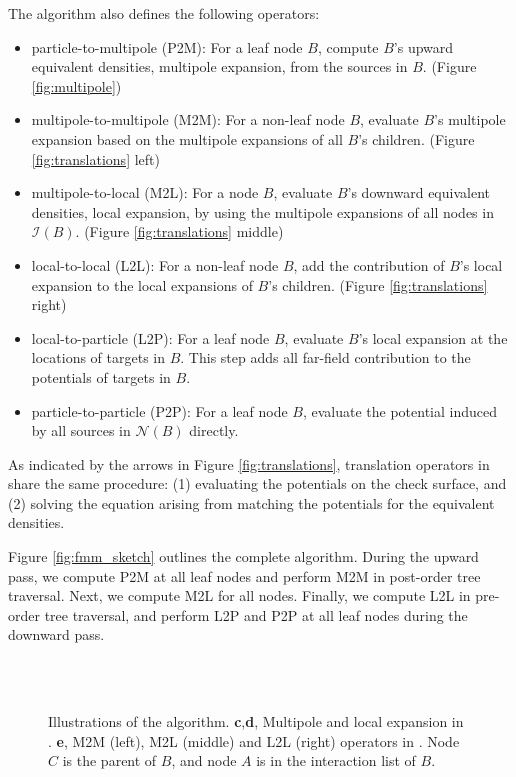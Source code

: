 The algorithm also defines the following operators:
%
\begin{itemize}
    \item particle-to-multipole (P2M): For a leaf node $B$, compute $B$'s upward equivalent densities, \ie multipole expansion, from the sources in $B$. (Figure \ref{fig:multipole})
    \item multipole-to-multipole (M2M): For a non-leaf node $B$, evaluate $B$'s multipole expansion based on the multipole expansions of all $B$'s children. (Figure \ref{fig:translations} left)
    \item multipole-to-local (M2L): For a node $B$, evaluate $B$'s downward equivalent densities, \ie local expansion, by using the multipole expansions of all nodes in $\mathcal{I}(B)$. (Figure \ref{fig:translations} middle)
    \item local-to-local (L2L): For a non-leaf node $B$, add the contribution of $B$'s local expansion to the local expansions of $B$'s children. (Figure \ref{fig:translations} right)
    \item local-to-particle (L2P): For a leaf node $B$, evaluate $B$'s local expansion at the locations of targets in $B$.
    This step adds all far-field contribution to the potentials of targets in $B$. 
    \item particle-to-particle (P2P): For a leaf node $B$, evaluate the potential induced by all sources in $\mathcal{N}(B)$ directly.
\end{itemize}
%
As indicated by the arrows in Figure \ref{fig:translations}, translation operators in \kifmm share the same procedure: (1) evaluating the potentials on the check surface, and (2) solving the equation arising from matching the potentials for the equivalent densities.

Figure \ref{fig:fmm_sketch} outlines the complete \fmm algorithm.
During the upward pass, we compute P2M at all leaf nodes and perform M2M in post-order tree traversal.
Next, we compute M2L for all nodes.
Finally, we compute L2L in pre-order tree traversal, and perform L2P and P2P at all leaf nodes during the downward pass.

\begin{figure*}
\centering
    \\
   \\
    \caption{Illustrations of the \fmm algorithm.
    \textbf{c},\textbf{d}, Multipole and local expansion in \kifmm.
    \textbf{e}, M2M (left), M2L (middle) and L2L (right) operators in \kifmm. Node $C$ is the parent of $B$, and node $A$ is in the interaction list of $B$.
    }
\end{figure*}

